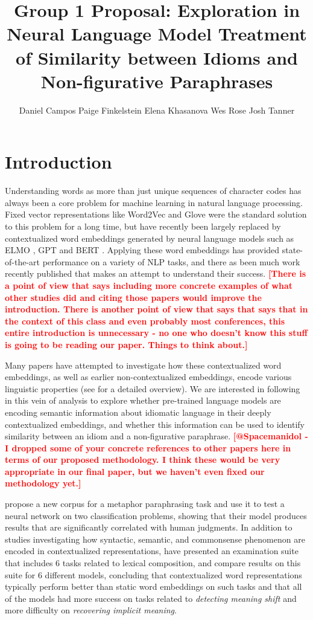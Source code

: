\documentclass[11pt,a4paper]{article}
\title{Group 1 Proposal: Exploration in  Neural Language Model Treatment of Similarity between Idioms and Non-figurative Paraphrases}
\author{Daniel Campos \And
  Paige Finkelstein \And 
    Elena Khasanova  \And
  Wes Rose  \And
  Josh Tanner   }
\newcommand{\comment}[1]{\textcolor{red}{\bf \small [#1]}}
\begin{document}
\maketitle
\section{Introduction}
Understanding words as more than just unique sequences of character codes has always been a core problem for machine learning in natural language processing. Fixed vector representations like Word2Vec \cite{Mikolov2013DistributedRO} and Glove \cite{Pennington2014GloveGV} were the standard solution to this problem for a long time, but have recently been largely replaced by contextualized word embeddings generated by neural language models such as  ELMO \cite{Peters2018DeepCW}, GPT \cite{Radford2018ImprovingLU} and BERT \cite{Devlin2019BERTPO}. Applying these word embeddings has provided state-of-the-art performance on a variety of NLP tasks, and there as been much work recently published that makes an attempt to understand their success. 
\comment{There is a point of view that says including more concrete examples of what other studies did and citing those papers would improve the introduction. There is another point of view that says that says that in the context of this class and even probably most conferences, this entire introduction is unnecessary - no one who doesn't know this stuff is going to be reading our paper. Things to think about.}

Many papers have attempted to investigate how these contextualized word embeddings, as well as earlier non-contextualized embeddings, encode various linguistic properties (see \citet{Belinkov_2019} for a detailed overview). We are interested in following in this vein of analysis to explore whether pre-trained language models are encoding semantic information about idiomatic language in their deeply contextualized embeddings, and whether this information can be used to identify similarity between an idiom and a non-figurative paraphrase.
\comment{@Spacemanidol - I dropped some of your concrete references to other papers here in terms of our proposed methodology. I think these would be very appropriate in our final paper, but we haven't even fixed our methodology yet.}

\citet{bizzoni-lappin-2018-predicting} propose a new corpus for a metaphor paraphrasing task and use it to test a neural network on two classification problems, showing that their model produces results that are significantly correlated with human judgments. In addition to studies investigating how syntactic, semantic, and commonsense \citep{zhou2019evaluating} phenomenon are encoded in contextualized representations, \citet{shwartz2019pain} have presented an examination suite that includes 6 tasks related to lexical composition, and compare results on this suite for 6 different models, concluding that contextualized word representations typically perform better than static word embeddings on such tasks and that all of the models had more success on tasks related to \textit{detecting meaning shift} and more difficulty on \textit{recovering implicit meaning}. 
\end{document}
